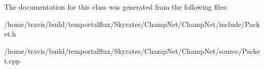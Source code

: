 The documentation for this class was generated from the following files\-:\begin{DoxyCompactItemize}
\item 
/home/travis/build/temportalflux/\-Skyrates/\-Champ\-Net/\-Champ\-Net/include/Packet.\-h\item 
/home/travis/build/temportalflux/\-Skyrates/\-Champ\-Net/\-Champ\-Net/source/Packet.\-cpp\end{DoxyCompactItemize}
